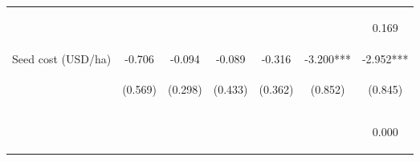 \begin{center}
\begin{tabular}{lcccccc}
\vspace{4pt} & \begin{footnotesize}[0.000]\end{footnotesize} & \begin{footnotesize}[0.562]\end{footnotesize} & \begin{footnotesize}[0.000]\end{footnotesize} & \begin{footnotesize}[0.959]\end{footnotesize} & \begin{footnotesize}[0.142]\end{footnotesize} & \begin{footnotesize}0.169\end{footnotesize} \\
Seed cost (USD/ha) & -0.706 & -0.094 & -0.089 & -0.316 & -3.200*** & -2.952*** \\
 & \begin{footnotesize}(0.569)\end{footnotesize} & \begin{footnotesize}(0.298)\end{footnotesize} & \begin{footnotesize}(0.433)\end{footnotesize} & \begin{footnotesize}(0.362)\end{footnotesize} & \begin{footnotesize}(0.852)\end{footnotesize} & \begin{footnotesize}(0.845)\end{footnotesize} \\
\vspace{4pt} & \begin{footnotesize}[0.215]\end{footnotesize} & \begin{footnotesize}[0.752]\end{footnotesize} & \begin{footnotesize}[0.838]\end{footnotesize} & \begin{footnotesize}[0.382]\end{footnotesize} & \begin{footnotesize}[0.000]\end{footnotesize} & \begin{footnotesize}0.000\end{footnotesize} \\

\end{tabular}
\end{center}
